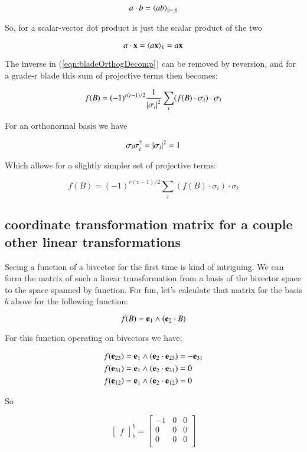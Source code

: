 \documentclass{article}      %
\begin{document}
\[
a \cdot b = \langle a b \rangle_{\lvert{i-j}\rvert}
\]

So, for a scalar-vector dot product is just the scalar product of the two

\[
a \cdot \mathbf{x} = \langle{ a \mathbf{x}}\rangle_1 = a \mathbf{x}
\]

The inverse in (\ref{eqn:bladeOrthogDecomp}) can be removed by reversion, and for a grade-r blade this sum of projective terms then becomes:

\begin{equation}
f(B) = (-1)^{r(r-1)/2} \frac{1}{{\lvert{\sigma_i}\rvert}^2}\sum_i (f(B) \cdot \sigma_i) \cdot {\sigma_i}
\end{equation}

For an orthonormal basis we have

\[
\sigma_i \sigma_i^\dagger = \lvert{\sigma_i}\rvert^2 = 1
\]

Which allows for a slightly simpler set of projective terms:

\begin{equation}
f(B) = (-1)^{r(r-1)/2} \sum_i (f(B) \cdot \sigma_i) \cdot {\sigma_i}
\end{equation}\label{eqn:OrthonormalDecomp}

\subsection{ coordinate transformation matrix for a couple other linear transformations }

Seeing a function of a bivector for the first time is kind of intriguing.  We can form the matrix of such a linear transformation
from a basis of the bivector space to the space spanned by function.  For fun, let's calculate that matrix for the basis $b$ above
for the following function:

\[
f(B) = \mathbf{e}_1 \wedge (\mathbf{e}_2 \cdot B)
\]

For this function operating on  bivectors we have:

\begin{align*}
f(\mathbf{e}_{23}) &= \mathbf{e}_1 \wedge (\mathbf{e}_2 \cdot \mathbf{e}_{23}) = -\mathbf{e}_{31} \\
f(\mathbf{e}_{31}) &= \mathbf{e}_1 \wedge (\mathbf{e}_2 \cdot \mathbf{e}_{31}) = 0 \\
f(\mathbf{e}_{12}) &= \mathbf{e}_1 \wedge (\mathbf{e}_2 \cdot \mathbf{e}_{12}) = 0 \\
\end{align*}

So

\[
{\begin{bmatrix}
f
\end{bmatrix}}_b^b
= 
\begin{bmatrix}
-1 & 0 & 0 \\
0 & 0 & 0 \\
0 & 0 & 0 \\
\end{bmatrix}
\]
\end{document}
